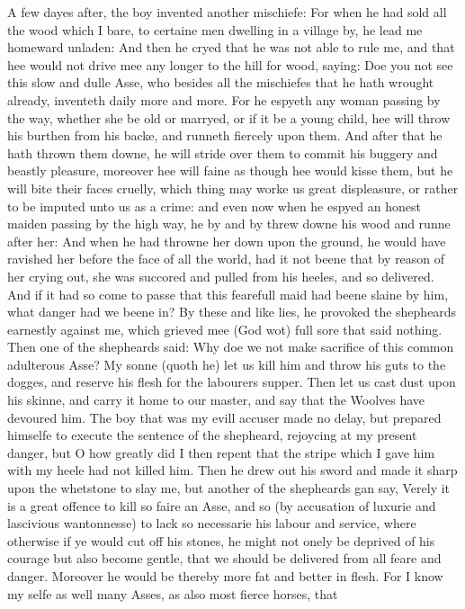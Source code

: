 A few dayes after, the boy invented another mischiefe: For when he had sold all
the wood which I bare, to certaine men dwelling in a village by, he lead me
homeward unladen: And then he cryed that he was not able to rule me, and that
hee would not drive mee any longer to the hill for wood, saying: Doe you not
see this slow and dulle Asse, who besides all the mischiefes that he hath
wrought already, inventeth daily more and more. For he espyeth any woman
passing by the way, whether she be old or marryed, or if it be a young child,
hee will throw his burthen from his backe, and runneth fiercely upon them. And
after that he hath thrown them downe, he will stride over them to commit his
buggery and beastly pleasure, moreover hee will faine as though hee would kisse
them, but he will bite their faces cruelly, which thing may worke us great
displeasure, or rather to be imputed unto us as a crime: and even now when he
espyed an honest maiden passing by the high way, he by and by threw downe his
wood and runne after her: And when he had throwne her down upon the ground, he
would have ravished her before the face of all the world, had it not beene that
by reason of her crying out, she was succored and pulled from his heeles, and
so delivered. And if it had so come to passe that this fearefull maid had beene
slaine by him, what danger had we beene in? By these and like lies, he provoked
the shepheards earnestly against me, which grieved mee (God wot) full sore that
said nothing. Then one of the shepheards said: Why doe we not make sacrifice of
this common adulterous Asse? My sonne (quoth he) let us kill him and throw his
guts to the dogges, and reserve his flesh for the labourers supper. Then let us
cast dust upon his skinne, and carry it home to our master, and say that the
Woolves have devoured him. The boy that was my evill accuser made no delay, but
prepared himselfe to execute the sentence of the shepheard, rejoycing at my
present danger, but O how greatly did I then repent that the stripe which I
gave him with my heele had not killed him. Then he drew out his sword and made
it sharp upon the whetstone to slay me, but another of the shepheards gan say,
Verely it is a great offence to kill so faire an Asse, and so (by accusation of
luxurie and lascivious wantonnesse) to lack so necessarie his labour and
service, where otherwise if ye would cut off his stones, he might not onely be
deprived of his courage but also become gentle, that we should be delivered
from all feare and danger. Moreover he would be thereby more fat and better in
flesh. For I know my selfe as well many Asses, as also most fierce horses, that

